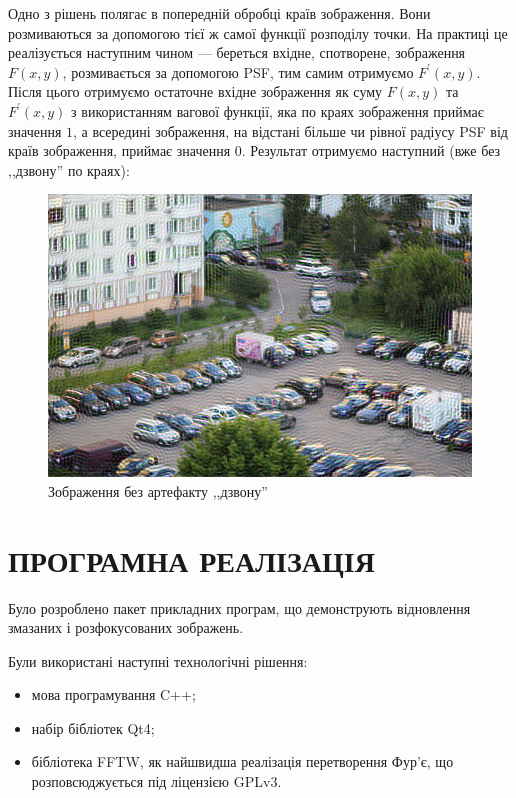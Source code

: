 \documentclass{diploma}
\begin{document}
    Одно з рішень полягає в попередній обробці країв зображення.
    Вони розмиваються за допомогою тієї ж самої функції розподілу точки.
    На практиці це реалізується наступним чином --- береться вхідне,
    спотворене, зображення $F\left( x, y \right)$, розмивається за допомогою
    PSF, тим самим отримуємо $F^\prime\left( x, y \right)$.
    Після цього отримуємо остаточне вхідне зображення як суму $F\left( x, y
    \right)$ та $F^\prime\left( x, y \right)$ з використанням вагової функції,
    яка по краях зображення приймає значення $1$, а всередині зображення,
    на відстані більше чи рівної радіусу PSF від країв зображення, приймає
    значення $0$.
    Результат отримуємо наступний (вже без ,,дзвону'' по краях):
    \begin{figure}[h]
      \centering
      \includegraphics[width=\linewidth]{edge-fixed.jpg}
      \caption{Зображення без артефакту ,,дзвону''}
      \label{fig:edge-fixed}
    \end{figure}

\chapter{ПРОГРАМНА РЕАЛІЗАЦІЯ}
  Було розроблено пакет прикладних програм, що демонструють відновлення
  змазаних і розфокусованих зображень.

  Були використані наступні технологічні рішення:
  \begin{itemize}
    \item мова програмування C++;
    \item набір бібліотек Qt4;
    \item бібліотека FFTW, як найшвидша реалізація перетворення Фур’є, що
      розповсюджується під ліцензією GPLv3.
  \end{itemize}
\end{document}
